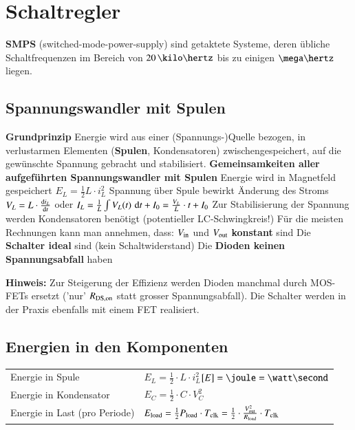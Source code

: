 \section{Schaltregler}

\textbf{SMPS} (switched-mode-power-supply) sind getaktete Systeme, deren übliche Schaltfrequenzen im Bereich von 
$20 \, \kilo \hertz$ bis zu einigen $\mega \hertz$ liegen.


\subsection{Spannungswandler mit Spulen}

\begin{outline} %
    \1 \textbf{Grundprinzip}
        \2 Energie wird aus einer (Spannungs-)Quelle bezogen, in verlustarmen Elementen (\textbf{Spulen}, Kondensatoren) 
            zwischengespeichert, auf die gewünschte Spannung gebracht und stabilisiert.
    \1 \textbf{Gemeinsamkeiten aller aufgeführten Spannungswandler mit Spulen}
        \2 Energie wird in Magnetfeld gespeichert $E_L = \frac{1}{2} L \cdot i_L^2$
        \2 Spannung über Spule bewirkt Änderung des Stroms \\
            $V_L = L \cdot \frac{\mathop{} \! \mathrm{d} i_L}{\mathop{} \! \mathrm{d} t}$ oder $I_L= \frac{1}{L} \int V_L(t) \, \mathop{} \! \mathrm{d} t + I_0  = \frac{V_L}{L} \cdot t + I_0$ 
        \2 Zur Stabilisierung der Spannung werden Kondensatoren benötigt (potentieller LC-Schwingkreis!)
        \2 Für die meisten Rechnungen kann man annehmen, dass:
            \3 $V_{\rm in}$ und $V_{\rm out}$ \textbf{konstant} sind
            \3 Die \textbf{Schalter ideal} sind (kein Schaltwiderstand)
            \3 Die \textbf{Dioden keinen Spannungsabfall} haben
\end{outline}

\textbf{Hinweis:} Zur Steigerung der Effizienz werden Dioden manchmal durch MOS-FETs ersetzt ('nur' $R_{\rm DS,on}$ statt grosser
Spannungsabfall). Die Schalter werden in der Praxis ebenfalls mit einem FET realisiert.

\subsection{Energien in den Komponenten}

\renewcommand{\arraystretch}{1.2}
\begin{tabular}{ll}
    Energie in Spule                & $E_L = \frac{1}{2} \cdot L \cdot i_L^2$\qquad $[E]=\joule=\watt\second$ \\
    Energie in Kondensator          & $E_C = \frac{1}{2} \cdot C \cdot V_C^2$ \\
    Energie in Last (pro Periode)   & $E_{\rm load} = \frac{1}{2} P_{\rm load} \cdot T_{\rm clk} = \frac{1}{2} \cdot \frac{V_{\rm out}^2}{R_{\rm load}} \cdot T_{\rm clk}$
\end{tabular}
\renewcommand{\arraystretch}{1}


